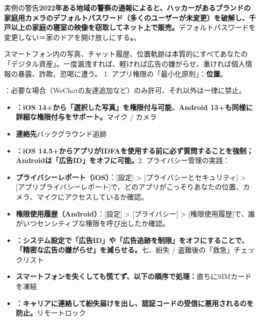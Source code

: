 実例の警告\textbf{2022年ある地域の警察の通報によると、ハッカーがあるブランドの家庭用カメラのデフォルトパスワード（多くのユーザーが未変更）を破解し、千戸以上の家庭の寝室の映像を窃取してネット上で販売。}デフォルトパスワードを変更しない＝家のドアを開け放しにする\textbf{。}。

\begin{tcbwarn}{スマートフォン内の写真、チャット履歴、位置軌跡は本質的にすべてあなたの「デジタル資産」。一度漏洩すれば、軽ければ広告の嫌がらせ、重ければ個人情報の暴露、詐欺、恐喝に遭う。}
1. アプリ権限の「最小化原則」：\textbf{位置}。

\end{tcbwarn}


：必要な場合（WeChatの友達追加など）のみ許可、それ以外は一律に禁止。


\begin{itemize}
  \item \textbf{：iOS 14+から「選択した写真」を権限付与可能、Android 13+も同様に詳細な権限付与をサポート。}マイク / カメラ
  \item \textbf{連絡先}バックグラウンド追跡
  \item \textbf{：iOS 14.5+からアプリがIDFAを使用する前に必ず質問することを強制；Androidは「広告ID」をオフに可能。}2. プライバシー管理の実践：
  \item \textbf{プライバシーレポート（iOS）}：[設定] > [プライバシーとセキュリティ] > [アプリプライバシーレポート]で、どのアプリがこっそりあなたの位置、カメラ、マイクにアクセスしているか確認。
  \item \textbf{権限使用履歴（Android）}：[設定] > [プライバシー] > [権限使用履歴]で、誰がいつセンシティブな権限を呼び出したか確認。
\end{itemize}


\begin{itemize}
  \item \textbf{：システム設定で「広告ID」や「広告追跡を制限」をオフにすることで、「精密な広告の嫌がらせ」を減らせる。}七、紛失 / 盗難後の「救急」チェックリスト
  \item \textbf{スマートフォンを失くしても慌てず、以下の順序で処理：}直ちにSIMカードを凍結
  \item \textbf{：キャリアに連絡して紛失届けを出し、認証コードの受信に悪用されるのを防止。}リモートロック
\end{itemize}


